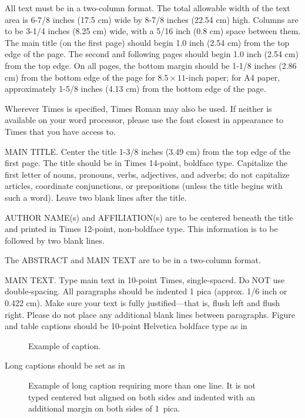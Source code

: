 \documentclass[times, 10pt,twocolumn]{article}
\begin{document}
All text must be in a two-column format. The total allowable width of the
text area is 6-7/8 inches (17.5 cm) wide by 8-7/8 inches (22.54 cm) high.
Columns are to be 3-1/4 inches (8.25 cm) wide, with a 5/16 inch (0.8 cm)
space between them.  The main title (on the first page) should begin 1.0
inch (2.54 cm) from the top edge of the page. The second and following
pages should begin 1.0 inch (2.54 cm) from the top edge. On all pages, the
bottom margin should be 1-1/8 inches (2.86 cm) from the bottom edge of the
page for $8.5 \times 11$-inch paper; for A4 paper, approximately 1-5/8
inches (4.13 cm) from the bottom edge of the page.


Wherever Times is specified, Times Roman may also be used.  If neither is
available on your word processor, please use the font closest in
appearance to Times that you have access to.

MAIN TITLE. Center the title 1-3/8 inches (3.49 cm) from the top edge of
the first page. The title should be in Times 14-point, boldface type.
Capitalize the first letter of nouns, pronouns, verbs, adjectives, and
adverbs; do not capitalize articles, coordinate conjunctions, or
prepositions (unless the title begins with such a word).  Leave two blank
lines after the title.

AUTHOR NAME(s) and AFFILIATION(s) are to be centered beneath the title and
printed in Times 12-point, non-boldface type.  This information is to be
followed by two blank lines.

The ABSTRACT and MAIN TEXT are to be in a two-column format. 

MAIN TEXT. Type main text in 10-point Times, single-spaced.  Do NOT use
double-spacing. All paragraphs should be indented 1 pica (approx. 1/6 inch
or 0.422 cm). Make sure your text is fully justified---that is, flush left
and flush right.  Please do not place any additional blank lines between
paragraphs.  Figure and table captions should be 10-point Helvetica
boldface type as in \begin{figure}[h] \caption{Example of caption.}
\end{figure}

\noindent Long captions should be set as in \begin{figure}[h]
	\caption{Example of long caption requiring more than one line. It is not
	typed centered but aligned on both sides and indented with an additional
margin on both sides of 1~pica.} \end{figure}
\end{document}
